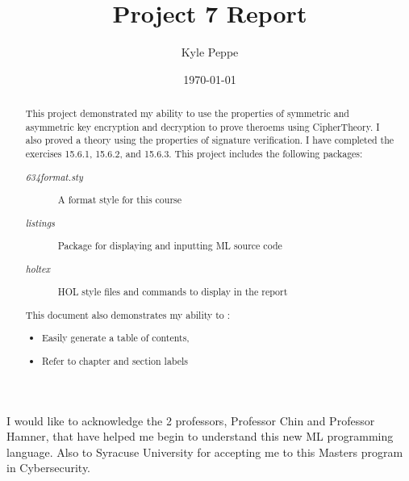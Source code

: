 \documentclass{report}
\title{Project 7 Report}
\author{Kyle Peppe}
\date{\today}
\begin{document}
\lstset{language=ML}


\maketitle{}

\begin{abstract}
  This project demonstrated my ability to use the properties of
  symmetric and asymmetric key encryption and decryption to prove
  theroems using CipherTheory. I also proved a theory using the
  properties of signature verification. I have completed the exercises
  15.6.1, 15.6.2, and 15.6.3.  This project includes the following
  packages:
	\begin{description}
		\item[\emph{634format.sty}] A format style for this course
		\item[\emph{listings}] Package for displaying and inputting ML source code
		\item[\emph{holtex}] HOL style files and commands to display in the report
	\end{description}
        This document also demonstrates my ability to :
	\begin{itemize}
		\item Easily generate a table of contents,
		\item Refer to chapter and section labels
	\end{itemize}
\end{abstract}

\tableofcontents{}

\begin{acknowledgments}
  I would like to acknowledge the 2 professors, Professor Chin and 
  Professor Hamner, that have helped me begin to understand this new
  ML programming language. Also to Syracuse University for accepting
  me to this Masters program in Cybersecurity.
\end{acknowledgments}
\end{document}
